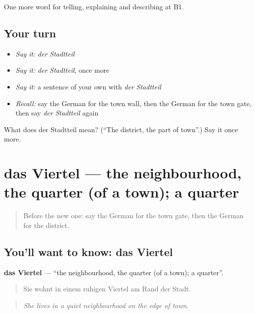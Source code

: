 \begin{grammarlens}[title={What you've built}]
One more word for telling, explaining and describing at B1.
\end{grammarlens}

\subsection*{Your turn}
\begin{itemize}
\raggedright
  \item \emph{Say it:} \emph{der Stadtteil}
  \item \emph{Say it:} \emph{der Stadtteil}, once more
  \item \emph{Say it:} a sentence of your own with \emph{der Stadtteil}
  \item \emph{Recall:} say the German for the town wall, then the German for the town gate, then say \emph{der Stadtteil} again
\end{itemize}

\begin{tcolorbox}[breakable,colback=teal!4,colframe=teal!35!black,title={Before you move on}]
What does der Stadtteil mean? (\textquotedblleft{}The district, the part of town\textquotedblright{}.) Say it once more.
\end{tcolorbox}
\section[das Viertel]{das Viertel — the neighbourhood, the quarter (of a town); a quarter}

\label{lesson:GE-C439-viertel}



\begin{quote}
Before the new one: say the German for the town gate, then the German for the district.
\end{quote}

\subsection*{You'll want to know: das Viertel}
\textbf{das Viertel} — \textquotedblleft{}the neighbourhood, the quarter (of a town); a quarter\textquotedblright{}.

\begin{quote}
Sie wohnt in einem ruhigen Viertel am Rand der Stadt.
\end{quote}

\begin{quote}
\emph{She lives in a quiet neighbourhood on the edge of town.}
\end{quote}


